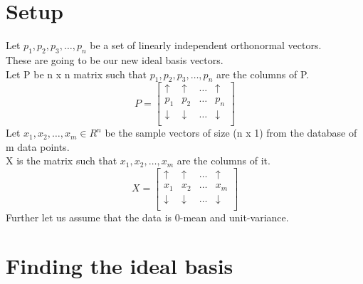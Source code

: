 \documentclass{article}
\begin{document}
\section{Setup}
Let $p_1,p_2,p_3,\dots,p_n$ be a set of linearly independent orthonormal vectors.\\
These are going to be our new ideal basis vectors.\\
Let P be n x n matrix such that $p_1,p_2,p_3,\dots,p_n$ are the columns of P.
$$
  P=\begin{bmatrix}
    \uparrow   & \uparrow   & \dots & \uparrow   \\
    p_1        & p_2        & \dots & p_n        \\
    \downarrow & \downarrow & \dots & \downarrow \\
  \end{bmatrix}
$$
Let $x_1,x_2,\dots,x_m\in R^n$ be the sample vectors of size (n x 1) from the database of m data points.\\
X is the matrix such that $x_1,x_2,\dots,x_m$ are the columns of it.\\
$$
  X=\begin{bmatrix}
    \uparrow   & \uparrow   & \dots & \uparrow   \\
    x_1        & x_2        & \dots & x_m        \\
    \downarrow & \downarrow & \dots & \downarrow \\
  \end{bmatrix}
$$
Further let us assume that the data is 0-mean and unit-variance.\\
\section{Finding the ideal basis}
\end{document}

